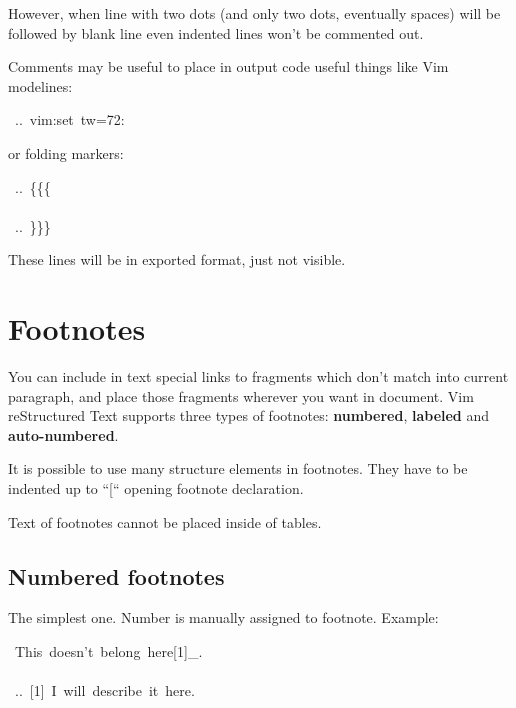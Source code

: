 \documentclass[12pt]{article}
\begin{document}
However, when line with two dots (and only two dots, eventually spaces) will
be followed by blank line even indented lines won't be commented out.

Comments may be useful to place in output code useful things like Vim
modelines:

\begin{ttfamily}\begin{flushleft}
\mbox{~..~vim:set~tw=72:}\\
\end{flushleft}\end{ttfamily}

or folding markers:

\begin{ttfamily}\begin{flushleft}
\mbox{~..~\{\{\{}\\
\mbox{}\\
\mbox{~..~\}\}\}}\\
\end{flushleft}\end{ttfamily}

These lines will be in exported format, just not visible.

\hypertarget{lfootnotes}{}
\section{Footnotes}

You can include in text special links to fragments which don't match
into current paragraph, and place those fragments wherever you want in
document. Vim reStructured Text supports three types of footnotes: \textbf{numbered}, \textbf{labeled}
and \textbf{auto-numbered}.

It is possible to use many structure elements in footnotes. They have to be
indented up to ``[`` opening footnote declaration.

Text of footnotes cannot be placed inside of tables.

\hypertarget{lnumbered-footnotes}{}
\subsection{Numbered footnotes}

The simplest one. Number is manually assigned to footnote. Example:

\begin{ttfamily}\begin{flushleft}
\mbox{~This~doesn't~belong~here[1]\_.}\\
\mbox{}\\
\mbox{~..~[1]~I~will~describe~it~here.}\\
\end{flushleft}\end{ttfamily}
\end{document}
